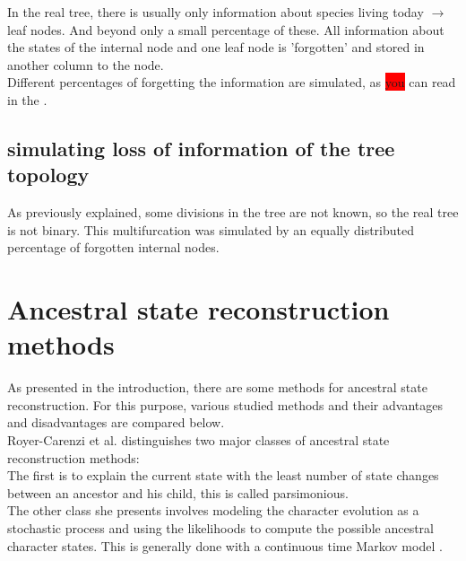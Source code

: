       In the real tree, there is usually only information about species living today $\rightarrow$ leaf 
        nodes. And beyond only a small percentage of these. All information about the states of the 
        internal node and one leaf node is 'forgotten' and stored in another column to the node. \\
      Different percentages of forgetting the information are simulated, as \colorbox{red}{you} can read 
      in the .

    \subsection{simulating loss of information of the tree topology}
      As previously explained, some divisions in the tree are not known, so the real tree is not binary.
      This multifurcation was simulated by an equally distributed percentage of forgotten internal nodes.

    \section{Ancestral state reconstruction methods}
      As presented in the introduction, there are some methods for ancestral state reconstruction. For 
        this purpose, various studied methods and their advantages and disadvantages are compared below. \\
    
      Royer-Carenzi et al. distinguishes two major classes of ancestral state reconstruction methods: \\
      The first is to explain the current state with the least number of state changes between an 
        ancestor and his child, this is called parsimonious. \\
      The other class she presents involves modeling the character evolution as a stochastic process and 
        using the likelihoods to compute the possible ancestral character states. This is generally done 
        with a continuous time Markov model \cite{RoyerCarenzi2013}. \\
       \\

